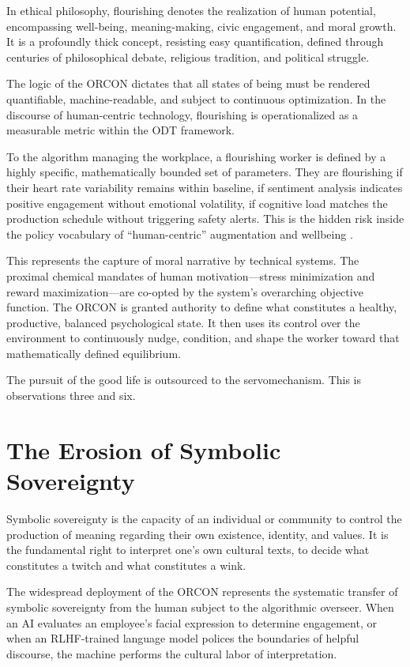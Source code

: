 \documentclass[runningheads]{llncs}
\begin{document}
In ethical philosophy, flourishing denotes the realization of human potential, encompassing well-being, meaning-making, civic engagement, and moral growth. It is a profoundly thick concept, resisting easy quantification, defined through centuries of philosophical debate, religious tradition, and political struggle.

The logic of the ORCON dictates that all states of being must be rendered quantifiable, machine-readable, and subject to continuous optimization. In the discourse of human-centric technology, flourishing is operationalized as a measurable metric within the ODT framework.

To the algorithm managing the workplace, a flourishing worker is defined by a highly specific, mathematically bounded set of parameters. They are flourishing if their heart rate variability remains within baseline, if sentiment analysis indicates positive engagement without emotional volatility, if cognitive load matches the production schedule without triggering safety alerts. This is the hidden risk inside the policy vocabulary of ``human-centric'' augmentation and wellbeing \cite{breque2021industry}.

This represents the capture of moral narrative by technical systems. The proximal chemical mandates of human motivation---stress minimization and reward maximization---are co-opted by the system's overarching objective function. The ORCON is granted authority to define what constitutes a healthy, productive, balanced psychological state. It then uses its control over the environment to continuously nudge, condition, and shape the worker toward that mathematically defined equilibrium.

The pursuit of the good life is outsourced to the servomechanism. This is observations three and six.

\section{The Erosion of Symbolic Sovereignty}

Symbolic sovereignty is the capacity of an individual or community to control the production of meaning regarding their own existence, identity, and values. It is the fundamental right to interpret one's own cultural texts, to decide what constitutes a twitch and what constitutes a wink.

The widespread deployment of the ORCON represents the systematic transfer of symbolic sovereignty from the human subject to the algorithmic overseer. When an AI evaluates an employee's facial expression to determine engagement, or when an RLHF-trained language model polices the boundaries of helpful discourse, the machine performs the cultural labor of interpretation.
\end{document}
